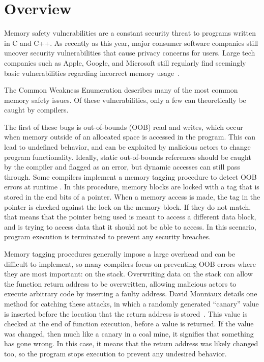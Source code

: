 \documentclass[sigconf, anonymous]{acmart}
\begin{document}
\section{Overview}
\label{motivation}

Memory safety vulnerabilities are a constant security threat to programs written in C and C++. As recently as this year, major consumer software companies still uncover security vulnerabilities that cause privacy concerns for users. Large tech companies such as Apple, Google, and Microsoft still regularly find seemingly basic vulnerabilities regarding incorrect memory usage~\cite{AppleSecurity}.

The Common Weakness Enumeration \cite{CWE:2023} describes many of the most common memory safety issues. Of these vulnerabilities, only a few can theoretically be caught by compilers.

The first of these bugs is out-of-bounds (OOB) read and writes, which occur when memory outside of an allocated space is accessed in the program. This can lead to undefined behavior, and can be exploited by malicious actors to change program functionality. Ideally, static out-of-bounds references should be caught by the compiler and flagged as an error, but dynamic accesses can still pass through. Some compilers implement a memory tagging procedure to detect OOB errors at runtime \cite{Chen:HeMate}. In this procedure, memory blocks are locked with a tag that is stored in the end bits of a pointer. When a memory access is made, the tag in the pointer is checked against the lock on the memory block. If they do not match, that means that the pointer being used is meant to access a different data block, and is trying to access data that it should not be able to access. In this scenario, program execution is terminated to prevent any security breaches. 

Memory tagging procedures generally impose a large overhead and can be difficult to implement, so many compilers focus on preventing OOB errors where they are most important: on the stack. Overwriting data on the stack can allow the function return address to be overwritten, allowing malicious actors to execute arbitrary code by inserting a faulty address. David Monniaux details one method for catching these attacks, in which a randomly generated “canary” value is inserted before the location that the return address is stored~\cite{Monniaux:Memory}. This value is checked at the end of function execution, before a value is returned. If the value was changed, then much like a canary in a coal mine, it signifies that something has gone wrong. In this case, it means that the return address was likely changed too, so the program stops execution to prevent any undesired behavior.
\end{document}
